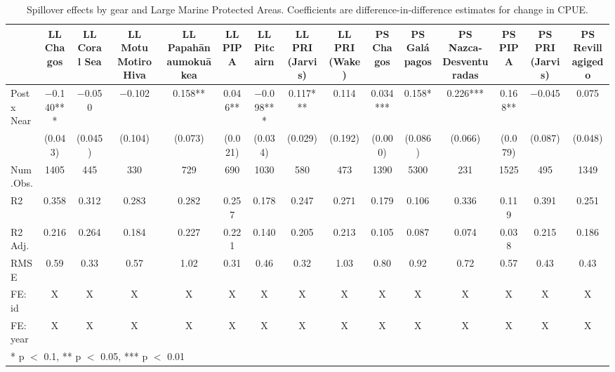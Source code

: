 \begin{table}

\caption{\label{tab:mpa_reg}Spillover effects by gear and Large Marine Protected Areas. Coefficients are
             difference-in-difference estimates for change in CPUE.}
\centering
\begin{tabular}[t]{lcccccccccccccc}
\toprule
  & LL Chagos & LL Coral Sea & LL Motu Motiro Hiva & LL Papahānaumokuākea & LL PIPA & LL Pitcairn & LL PRI (Jarvis) & LL PRI (Wake) & PS Chagos & PS Galápagos & PS Nazca-Desventuradas & PS PIPA & PS PRI (Jarvis) & PS Revillagigedo\\
\midrule
Post x Near & \num{-0.140}*** & \num{-0.050} & \num{-0.102} & \num{0.158}** & \num{0.046}** & \num{-0.098}*** & \num{0.117}*** & \num{0.114} & \num{0.034}*** & \num{0.158}* & \num{0.226}*** & \num{0.168}** & \num{-0.045} & \num{0.075}\\
 & (\num{0.043}) & (\num{0.045}) & (\num{0.104}) & (\num{0.073}) & (\num{0.021}) & (\num{0.034}) & (\num{0.029}) & (\num{0.192}) & (\num{0.000}) & (\num{0.086}) & (\num{0.066}) & (\num{0.079}) & (\num{0.087}) & (\num{0.048})\\
\midrule
Num.Obs. & \num{1405} & \num{445} & \num{330} & \num{729} & \num{690} & \num{1030} & \num{580} & \num{473} & \num{1390} & \num{5300} & \num{231} & \num{1525} & \num{495} & \num{1349}\\
R2 & \num{0.358} & \num{0.312} & \num{0.283} & \num{0.282} & \num{0.257} & \num{0.178} & \num{0.247} & \num{0.271} & \num{0.179} & \num{0.106} & \num{0.336} & \num{0.119} & \num{0.391} & \num{0.251}\\
R2 Adj. & \num{0.216} & \num{0.264} & \num{0.184} & \num{0.227} & \num{0.221} & \num{0.140} & \num{0.205} & \num{0.213} & \num{0.105} & \num{0.087} & \num{0.074} & \num{0.038} & \num{0.215} & \num{0.186}\\
RMSE & \num{0.59} & \num{0.33} & \num{0.57} & \num{1.02} & \num{0.31} & \num{0.46} & \num{0.32} & \num{1.03} & \num{0.80} & \num{0.92} & \num{0.72} & \num{0.57} & \num{0.43} & \num{0.43}\\
FE: id & X & X & X & X & X & X & X & X & X & X & X & X & X & X\\
FE: year & X & X & X & X & X & X & X & X & X & X & X & X & X & X\\
\bottomrule
\multicolumn{15}{l}{\rule{0pt}{1em}* p $<$ 0.1, ** p $<$ 0.05, *** p $<$ 0.01}\\
\end{tabular}
\end{table}
